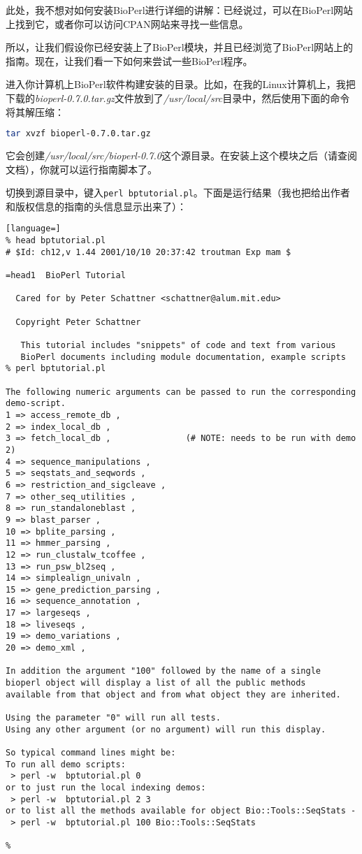 此处，我不想对如何安装BioPerl进行详细的讲解：已经说过，可以在BioPerl网站上找到它，或者你可以访问CPAN网站来寻找一些信息。

所以，让我们假设你已经安装上了BioPerl模块，并且已经浏览了BioPerl网站上的指南。现在，让我们看一下如何来尝试一些BioPerl程序。

进入你计算机上BioPerl软件构建安装的目录。比如，在我的Linux计算机上，我把下载的\textit{bioperl-0.7.0.tar.gz}文件放到了\textit{/usr/local/src}目录中，然后使用下面的命令将其解压缩：

\begin{lstlisting}[language=bash]
tar xvzf bioperl-0.7.0.tar.gz
\end{lstlisting}

它会创建\textit{/usr/local/src/bioperl-0.7.0}这个源目录。在安装上这个模块之后（请查阅文档），你就可以运行指南脚本了。

切换到源目录中，键入\verb|perl bptutorial.pl|。下面是运行结果（我也把给出作者和版权信息的指南的头信息显示出来了）：

\begin{lstlisting}[language=]
% head bptutorial.pl 
# $Id: ch12,v 1.44 2001/10/10 20:37:42 troutman Exp mam $

=head1  BioPerl Tutorial

  Cared for by Peter Schattner <schattner@alum.mit.edu>

  Copyright Peter Schattner

   This tutorial includes "snippets" of code and text from various
   BioPerl documents including module documentation, example scripts
% perl bptutorial.pl 

The following numeric arguments can be passed to run the corresponding demo-script.
1 => access_remote_db ,
2 => index_local_db ,
3 => fetch_local_db ,               (# NOTE: needs to be run with demo 2)
4 => sequence_manipulations ,
5 => seqstats_and_seqwords ,
6 => restriction_and_sigcleave ,
7 => other_seq_utilities ,
8 => run_standaloneblast ,
9 => blast_parser ,
10 => bplite_parsing ,
11 => hmmer_parsing ,
12 => run_clustalw_tcoffee ,
13 => run_psw_bl2seq ,
14 => simplealign_univaln ,
15 => gene_prediction_parsing ,
16 => sequence_annotation ,
17 => largeseqs ,
18 => liveseqs ,
19 => demo_variations ,
20 => demo_xml ,

In addition the argument "100" followed by the name of a single
bioperl object will display a list of all the public methods
available from that object and from what object they are inherited.

Using the parameter "0" will run all tests.
Using any other argument (or no argument) will run this display.

So typical command lines might be:
To run all demo scripts:
 > perl -w  bptutorial.pl 0
or to just run the local indexing demos:
 > perl -w  bptutorial.pl 2 3
or to list all the methods available for object Bio::Tools::SeqStats -
 > perl -w  bptutorial.pl 100 Bio::Tools::SeqStats

%
\end{lstlisting}

